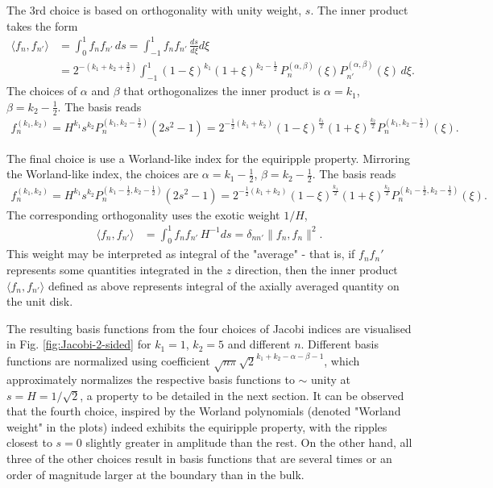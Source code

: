 The 3rd choice is based on orthogonality with unity weight, $s$. The inner product takes the form
%
\[\begin{aligned}
    \langle f_n, f_{n'} \rangle &= \int_{0}^1 f_n f_{n'}\, ds = \int_{-1}^1 f_n f_{n'} \, \frac{ds}{d\xi} d\xi \\ 
    &= 2^{-\left(k_1 + k_2 + \frac{3}{2}\right)} \int_{-1}^{1} (1 - \xi)^{k_1} (1 + \xi)^{k_2 - \frac{1}{2}} \, P_n^{(\alpha, \beta)}(\xi) P_{n'}^{(\alpha, \beta)}(\xi) \, d\xi.
\end{aligned}\]
%
The choices of $\alpha$ and $\beta$ that orthogonalizes the inner product is $\alpha = k_1$, $\beta = k_2 - \frac{1}{2}$. The basis reads
%
\begin{equation}
\begin{aligned}
    f_n^{(k_1, k_2)} = H^{k_1} s^{k_2} P_n^{(k_1, k_2 - \frac{1}{2})}(2s^2 - 1) = 2^{-\frac{1}{2}(k_1 + k_2)} (1 - \xi)^{\frac{k_1}{2}} (1 + \xi)^{\frac{k_2}{2}} P_n^{(k_1, k_2 - \frac{1}{2})}(\xi).
\end{aligned}
\end{equation}
%

The final choice is use a Worland-like index for the equiripple property. Mirroring the Worland-like index, the choices are $\alpha = k_1 - \frac{1}{2}$, $\beta = k_2 - \frac{1}{2}$. The basis reads
%
\begin{equation}\label{eqn:Jacobi-2-sided-Worland}
\begin{aligned}
    f_n^{(k_1, k_2)} = H^{k_1} s^{k_2} P_n^{(k_1 - \frac{1}{2}, k_2 - \frac{1}{2})}(2s^2 - 1) = 2^{-\frac{1}{2}(k_1 + k_2)} (1 - \xi)^{\frac{k_1}{2}} (1 + \xi)^{\frac{k_2}{2}} P_n^{(k_1 - \frac{1}{2}, k_2 - \frac{1}{2})}(\xi).
\end{aligned}
\end{equation}
%
The corresponding orthogonality uses the exotic weight $1/H$,
%
\[\begin{aligned}
    \langle f_n, f_{n'} \rangle &= \int_{0}^1 f_n f_{n'}\, H^{-1} ds = \delta_{nn'} \| f_n, f_n \|^2.
\end{aligned}\]
%
This weight may be interpreted as integral of the "average" - that is, if $f_n f_n'$ represents some quantities integrated in the $z$ direction, then the inner product $\langle f_n, f_{n'} \rangle$ defined as above represents integral of the axially averaged quantity on the unit disk.

The resulting basis functions from the four choices of Jacobi indices are visualised in Fig. \ref{fig:Jacobi-2-sided} for $k_1=1$, $k_2=5$ and different $n$. Different basis functions are normalized using coefficient $\sqrt{n\pi} \sqrt{2}^{k_1 + k_2 - \alpha - \beta - 1}$, which approximately normalizes the respective basis functions to $\sim$ unity at $s=H=1/\sqrt{2}$, a property to be detailed in the next section.
It can be observed that the fourth choice, inspired by the Worland polynomials (denoted "Worland weight" in the plots) indeed exhibits the equiripple property, with the ripples closest to $s=0$ slightly greater in amplitude than the rest.
On the other hand, all three of the other choices result in basis functions that are several times or an order of magnitude larger at the boundary than in the bulk.

